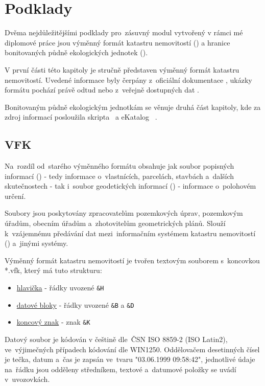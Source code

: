 \chapter{Podklady}
\label{podklady}

Dvěma nejdůležitějšími podklady pro~zásuvný modul vytvořený v rámci mé diplomové práce jsou výměnný formát katastru nemovitostí () a hranice bonitovaných půdně ekologických jednotek ().

V první části této kapitoly je stručně představen výměnný formát katastru nemovitostí. Uvedené informace byly čerpány z~oficiální dokumentace \citep{struktura_vfk}, ukázky formátu pochází právě odtud nebo z~veřejně dostupných dat \citep{zdroj_vfk}.

Bonitovaným půdně ekologickým jednotkám se věnuje druhá část kapitoly, kde za zdroj informací posloužila skripta~\citep{pu_skripta} a eKatalog ~\citep{vumop_bpej}.

\section{VFK}
\label{vfk}

Na~rozdíl od~starého výměnného formátu obsahuje  jak soubor popisných informací () - tedy informace o~vlastnících, parcelách, stavbách a~dalších skutečnostech - tak i~soubor geodetických informací () - informace o~polohovém určení.

Soubory  jsou poskytovány zpracovatelům pozemkových úprav, pozemkovým úřadům, obecním úřadům a~zhotovitelům geometrických plánů. Slouží k~vzájemnému předávání dat mezi~informačním systémem katastru nemovitostí () a~jinými systémy.

Výměnný formát katastru nemovitostí je tvořen textovým souborem s~koncovkou *.vfk, který má tuto strukturu:
	\begin{itemize}[leftmargin=1.5cm, noitemsep]
		\item \underline{hlavička} - řádky uvozené \texttt{\&H}
		\item \underline{datové bloky} - řádky uvozené \texttt{\&B} a \texttt{\&D}
		\item \underline{koncový znak} - znak \texttt{\&K}
	\end{itemize}

Datový soubor je kódován v češtině dle~ČSN ISO 8859-2 (ISO Latin2), ve~výjimečných případech kódování dle
WIN1250. Oddělovačem desetinných čísel je tečka, datum a~čas je zapsán ve~tvaru "03.06.1999 09:58:42", jednotlivé údaje na~řádku jsou odděleny středníkem, textové a~datumové položky se uvádí v~uvozovkách.

